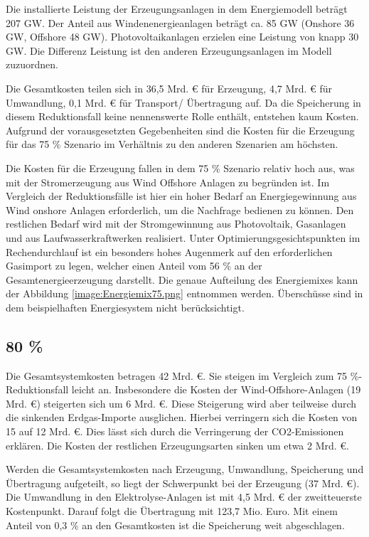 Die installierte Leistung der Erzeugungsanlagen in dem Energiemodell beträgt 207 GW.  Der Anteil aus Windenenergieanlagen beträgt ca. 85 GW (Onshore 36 GW, Offshore 48 GW). Photovoltaikanlagen erzielen eine Leistung von knapp 30 GW. Die Differenz Leistung ist den anderen Erzeugungsanlagen im Modell zuzuordnen. 

Die Gesamtkosten teilen sich in 36,5 Mrd. € für Erzeugung, 4,7 Mrd. € für Umwandlung, 0,1 Mrd. € für Transport/ Übertragung auf. Da die Speicherung in diesem Reduktionsfall keine nennenswerte Rolle enthält, entstehen kaum Kosten. Aufgrund der vorausgesetzten Gegebenheiten sind die Kosten für die Erzeugung für das 75 \% Szenario im Verhältnis zu den anderen Szenarien am höchsten. 

Die Kosten für die Erzeugung fallen in dem 75 \% Szenario relativ hoch aus, was mit der Stromerzeugung aus Wind Offshore Anlagen zu begründen ist. Im Vergleich der Reduktionsfälle ist hier ein hoher Bedarf an Energiegewinnung aus Wind onshore Anlagen erforderlich, um die Nachfrage bedienen zu können. Den restlichen Bedarf wird mit der Stromgewinnung aus Photovoltaik, Gasanlagen und aus Laufwasserkraftwerken realisiert. Unter Optimierungsgesichtspunkten im Rechendurchlauf ist ein besonders hohes Augenmerk auf den erforderlichen Gasimport zu legen, welcher einen Anteil vom 56 \% an der Gesamtenergieerzeugung darstellt. Die genaue Aufteilung des Energiemixes kann der Abbildung \ref{image:Energiemix75.png} entnommen werden. Überschüsse sind in dem beispielhaften Energiesystem nicht berücksichtigt.
 



\subsection{80 \%}
Die Gesamtsystemkosten betragen 42 Mrd. €. Sie steigen im Vergleich zum 75 \%-Reduktionsfall leicht an. Insbesondere die Kosten der Wind-Offshore-Anlagen (19 Mrd. €) steigerten sich um 6 Mrd. €. Diese Steigerung wird aber teilweise durch die sinkenden Erdgas-Importe ausglichen. Hierbei verringern sich die Kosten von 15 auf 12 Mrd. €. Dies lässt sich durch die Verringerung der CO2-Emissionen erklären. Die Kosten der restlichen Erzeugungsarten sinken um etwa 2 Mrd. €.

Werden die Gesamtsystemkosten nach Erzeugung, Umwandlung, Speicherung und Übertragung aufgeteilt, so liegt der Schwerpunkt bei der Erzeugung (37 Mrd. €). Die Umwandlung in den Elektrolyse-Anlagen ist mit 4,5 Mrd. € der zweitteuerste Kostenpunkt. Darauf folgt die Übertragung mit 123,7 Mio. Euro. Mit einem Anteil von 0,3 \% an den Gesamtkosten ist die Speicherung weit abgeschlagen.

